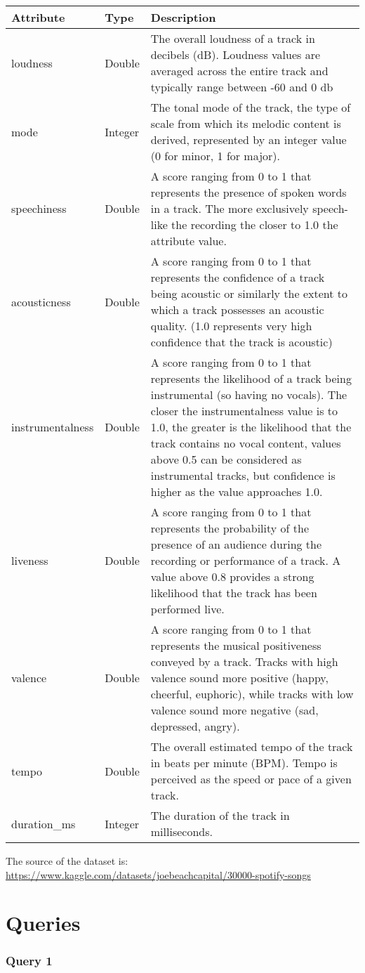 \documentclass{Configuration_Files/PoliMi3i_thesis}
\begin{document}
\begin{table}[h!]
	\begin{center}
		\hspace*{-1cm}
		\begin{tabular}{|m{8em}|m{4em}|m{29em}|}
		\hline
		\textbf{Attribute} & \textbf{Type} & \textbf{Description}\\
		\hline
			loudness & Double & The overall loudness of a track in decibels (dB). Loudness values are averaged across the entire track and typically range between -60 and 0 db\\
		\hline
			mode & Integer & The tonal mode of the track, the type of scale from which its melodic content is derived, represented by an integer value (0 for minor, 1 for major).\\
		\hline
			speechiness & Double & A score ranging from 0 to 1 that represents the presence of spoken words in a track. The more exclusively speech-like the recording the closer to 1.0 the attribute value.\\
		\hline
			acousticness & Double & A score ranging from 0 to 1 that represents the confidence of a track being acoustic or similarly the extent to which a track possesses an acoustic quality. (1.0 represents very high confidence that the track is acoustic)\\
		\hline
			instrumentalness & Double & A score ranging from 0 to 1 that represents the likelihood of a track being instrumental (so having no vocals). The closer the instrumentalness value is to 1.0, the greater is the likelihood that the track contains no vocal content, values above 0.5 can be considered as instrumental tracks, but confidence is higher as the value approaches 1.0.\\
		\hline
			liveness & Double & A score ranging from 0 to 1 that represents the probability of the presence of an audience during the recording or performance of a track. A value above 0.8 provides a strong likelihood that the track has been performed live.\\
		\hline
			valence & Double & A score ranging from 0 to 1 that represents the musical positiveness conveyed by a track. Tracks with high valence sound more positive (happy, cheerful, euphoric), while tracks with low valence sound more negative (sad, depressed, angry).\\
		\hline
			tempo & Double & The overall estimated tempo of the track in beats per minute (BPM). Tempo is perceived as the speed or pace of a given track.\\
		\hline
			duration\_ms & Integer & The duration of the track in milliseconds.\\
		\hline
		\end{tabular}
		\hspace*{1cm}
	\end{center}
\end{table}
The source of the dataset is:\\
\url{https://www.kaggle.com/datasets/joebeachcapital/30000-spotify-songs}
\newpage
\section{Queries}
\subsubsection{Query 1}



\end{document}
